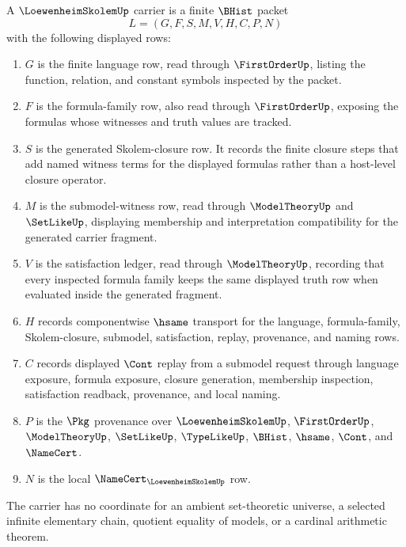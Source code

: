\begin{definition}
\label{def:loewenheim-skolem-carrier}
A $\LoewenheimSkolemUp$ carrier is a finite $\BHist$ packet
$$
L=(G,F,S,M,V,H,C,P,N)
$$
with the following displayed rows:
\begin{enumerate}
\item $G$ is the finite language row, read through $\FirstOrderUp$, listing the function, relation, and constant symbols inspected by the packet.
\item $F$ is the formula-family row, also read through $\FirstOrderUp$, exposing the formulas whose witnesses and truth values are tracked.
\item $S$ is the generated Skolem-closure row. It records the finite closure steps that add named witness terms for the displayed formulas rather than a host-level closure operator.
\item $M$ is the submodel-witness row, read through $\ModelTheoryUp$ and $\SetLikeUp$, displaying membership and interpretation compatibility for the generated carrier fragment.
\item $V$ is the satisfaction ledger, read through $\ModelTheoryUp$, recording that every inspected formula family keeps the same displayed truth row when evaluated inside the generated fragment.
\item $H$ records componentwise $\hsame$ transport for the language, formula-family, Skolem-closure, submodel, satisfaction, replay, provenance, and naming rows.
\item $C$ records displayed $\Cont$ replay from a submodel request through language exposure, formula exposure, closure generation, membership inspection, satisfaction readback, provenance, and local naming.
\item $P$ is the $\Pkg$ provenance over $\LoewenheimSkolemUp$, $\FirstOrderUp$, $\ModelTheoryUp$, $\SetLikeUp$, $\TypeLikeUp$, $\BHist$, $\hsame$, $\Cont$, and $\NameCert$.
\item $N$ is the local $\NameCert_{\LoewenheimSkolemUp}$ row.
\end{enumerate}
The carrier has no coordinate for an ambient set-theoretic universe, a selected infinite elementary chain, quotient equality of models, or a cardinal arithmetic theorem.
\end{definition}

